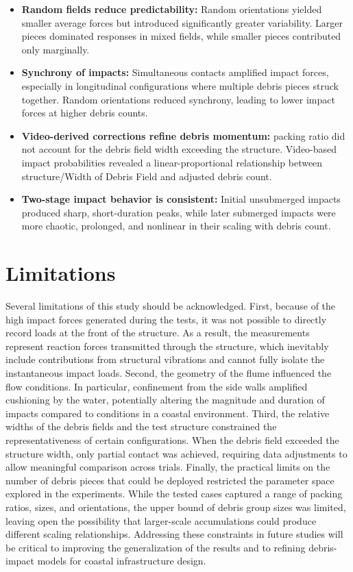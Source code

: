 \documentclass{article}
\begin{document}
{\begin{itemize}
    \item \textbf{Random fields reduce predictability:} Random orientations yielded smaller average forces but introduced significantly greater variability. Larger pieces dominated responses in mixed fields, while smaller pieces contributed only marginally.
   
    \item \textbf{Synchrony of impacts:} Simultaneous contacts amplified impact forces, especially in longitudinal configurations where multiple debris pieces struck together. Random orientations reduced synchrony, leading to lower impact forces at higher debris counts.
    
    \item \textbf{Video-derived corrections refine debris momentum:} packing ratio did not account for the debris field width exceeding the structure. Video-based impact probabilities revealed a linear-proportional relationship between structure/Width of Debris Field and adjusted debris count. 


    \item \textbf{Two-stage impact behavior is consistent:} Initial unsubmerged impacts produced sharp, short-duration peaks, while later submerged impacts were more chaotic, prolonged, and nonlinear in their scaling with debris count.
\end{itemize}


\section{Limitations}
Several limitations of this study should be acknowledged. First, because of the high impact forces generated during the tests, it was not possible to directly record loads at the front of the structure. As a result, the measurements represent reaction forces transmitted through the structure, which inevitably include contributions from structural vibrations and cannot fully isolate the instantaneous impact loads. Second, the geometry of the flume influenced the flow conditions. In particular, confinement from the side walls amplified cushioning by the water, potentially altering the magnitude and duration of impacts compared to conditions in a coastal environment. Third, the relative widths of the debris fields and the test structure constrained the representativeness of certain configurations. When the debris field exceeded the structure width, only partial contact was achieved, requiring data adjustments to allow meaningful comparison across trials. Finally, the practical limits on the number of debris pieces that could be deployed restricted the parameter space explored in the experiments. While the tested cases captured a range of packing ratios, sizes, and orientations, the upper bound of debris group sizes was limited, leaving open the possibility that larger-scale accumulations could produce different scaling relationships. Addressing these constraints in future studies will be critical to improving the generalization of the results and to refining debris-impact models for coastal infrastructure design.

}
\end{document}
